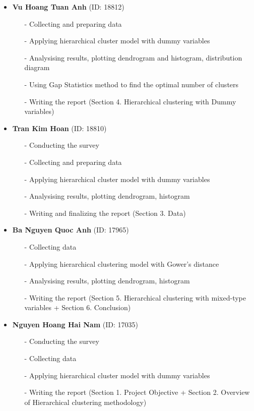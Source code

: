 \documentclass{tuna-report}
\begin{document}
\begin{itemize}
    \item \textbf{Vu Hoang Tuan Anh} (ID: 18812)
        \begin{itemize}
            \item[-] Collecting and preparing data
            \item[-] Applying hierarchical cluster model with dummy variables
            \item[-] Analysising results, plotting dendrogram and histogram, distribution diagram
            \item[-] Using Gap Statistics method to find the optimal number of clusters
            \item[-] Writing the report (Section 4. Hierarchical clustering with Dummy variables)
        \end{itemize}
        
    \item \textbf{Tran Kim Hoan} (ID: 18810)
        \begin{itemize}
            \item[-] Conducting the survey
            \item[-] Collecting and preparing data
            \item[-] Applying hierarchical cluster model with dummy variables
            \item[-] Analysising results, plotting dendrogram, histogram
            \item[-] Writing and finalizing the report (Section 3. Data)
        \end{itemize}
        
    \item \textbf{Ba Nguyen Quoc Anh} (ID: 17965)
        \begin{itemize}
            \item[-] Collecting data
            \item[-] Applying hierarchical clustering model with Gower's distance
            \item[-] Analysising results, plotting dendrogram, histogram
            \item[-] Writing the report (Section 5. Hierarchical clustering with mixed-type variables + Section 6. Conclusion)
        \end{itemize}

    \item \textbf{Nguyen Hoang Hai Nam} (ID: 17035)
        \begin{itemize}
            \item[-] Conducting the survey
            \item[-] Collecting data
            \item[-] Applying hierarchical cluster model with dummy variables
            \item[-] Writing the report (Section 1. Project Objective + Section 2. Overview of Hierarchical clustering methodology)
        \end{itemize}
\end{itemize}
\end{document}
